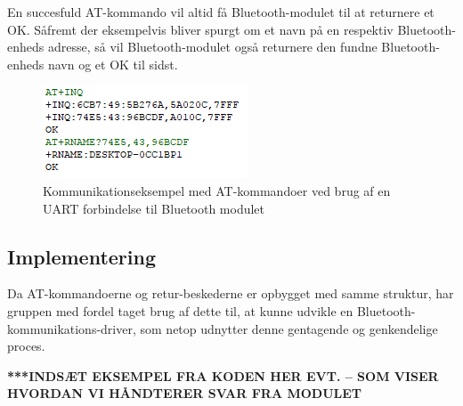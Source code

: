 En succesfuld AT-kommando vil altid få Bluetooth-modulet til at returnere et OK. Såfremt der eksempelvis bliver spurgt om et navn på en respektiv Bluetooth-enheds adresse, så vil Bluetooth-modulet også returnere den fundne Bluetooth-enheds navn og et OK til sidst. 

\begin{figure}[H]
	\centering
	\includegraphics[width = 200 pt]{Img/uart_eksempel.PNG}
	\caption{Kommunikationseksempel med AT-kommandoer ved brug af en UART forbindelse til Bluetooth modulet}
	\label{fig:UART}
\end{figure}

\subsection{Implementering}

Da AT-kommandoerne og retur-beskederne er opbygget med samme struktur, har gruppen med fordel taget brug af dette til, at kunne udvikle en Bluetooth-kommunikations-driver, som netop udnytter denne gentagende og genkendelige proces. 

\textbf{***INDSÆT EKSEMPEL FRA KODEN HER EVT. – SOM VISER HVORDAN VI HÅNDTERER SVAR FRA MODULET}
